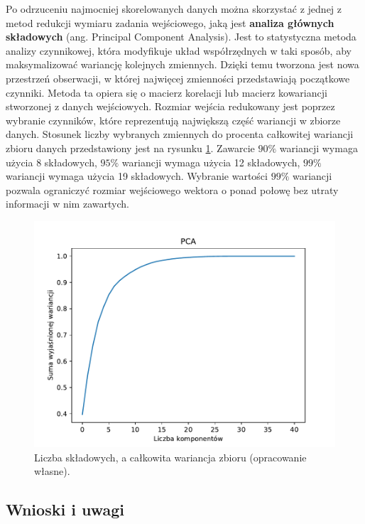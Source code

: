 \documentclass[a4paper, twoside, 11pt, openright]{article}
\begin{document}
Po odrzuceniu najmocniej skorelowanych danych można skorzystać z jednej z metod redukcji wymiaru zadania wejściowego, jaką jest \textbf{analiza głównych składowych} (ang. Principal Component Analysis). Jest to statystyczna metoda analizy czynnikowej, która modyfikuje układ współrzędnych w taki sposób, aby maksymalizować wariancję kolejnych zmiennych. Dzięki temu tworzona jest nowa przestrzeń obserwacji, w której najwięcej zmienności przedstawiają początkowe czynniki. Metoda ta opiera się o macierz korelacji lub macierz kowariancji stworzonej z danych wejściowych. Rozmiar wejścia redukowany jest poprzez wybranie czynników, które reprezentują największą część wariancji w zbiorze danych. Stosunek liczby wybranych zmiennych do procenta całkowitej wariancji zbioru danych przedstawiony jest na rysunku \ref{img:pca_variance}. Zawarcie $90\%$ wariancji wymaga użycia 8 składowych,  $95\%$ wariancji wymaga użycia 12 składowych, $99\%$ wariancji wymaga użycia 19 składowych. Wybranie wartości $99\%$ wariancji pozwala ograniczyć rozmiar wejściowego wektora o ponad połowę bez utraty informacji w nim zawartych.

\begin{figure}[H]
\centering 
\includegraphics[scale=0.9]{img/pca_variance.pdf}
\caption{Liczba składowych, a całkowita wariancja zbioru (opracowanie własne).}
\label{img:pca_variance}
\end{figure}

\subsection{Wnioski i uwagi}
\end{document}
